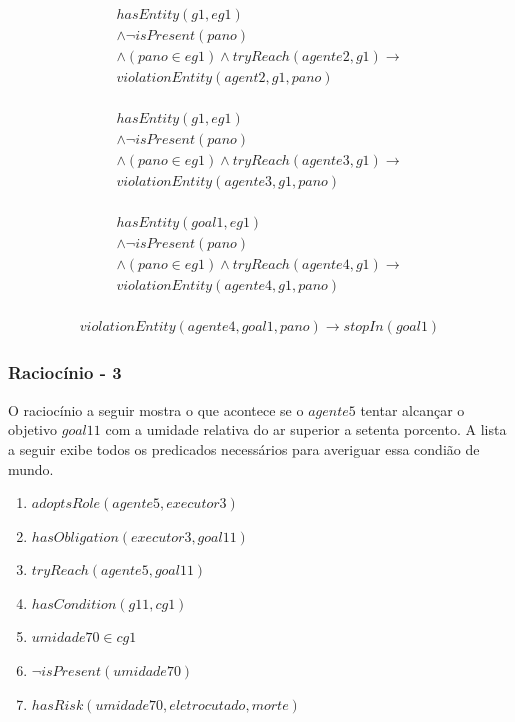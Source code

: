 \documentclass[12pt]{article}
\begin{document}
\begin{eqnarray}\nonumber
	hasEntity(g1,eg1) \nonumber \\ 
	\wedge \neg isPresent(pano) 	\nonumber \\ 
	\wedge (pano \in eg1) \wedge tryReach(agente2,g1) \to \nonumber \\ 
	violationEntity(agent2,g1,pano) \nonumber \\
\end{eqnarray}

\begin{eqnarray}\nonumber
	hasEntity(g1,eg1) \nonumber \\ 
	\wedge \neg isPresent(pano) 	\nonumber \\ 
	\wedge (pano \in eg1) \wedge tryReach(agente3,g1) \to \nonumber \\ 
	violationEntity(agente3,g1,pano) \nonumber \\
\end{eqnarray}

\begin{eqnarray}\nonumber
	hasEntity(goal1,eg1) \nonumber \\ 
	\wedge \neg isPresent(pano) 	\nonumber \\ 
	\wedge (pano \in eg1) \wedge tryReach(agente4,g1) \to \nonumber \\ 
	violationEntity(agente4,g1,pano) \nonumber \\
\end{eqnarray}

\begin{eqnarray}
	violationEntity(agente4,goal1,pano) \to stopIn(goal1)
\end{eqnarray}



\subsubsection{Raciocínio - 3} 

O raciocínio a seguir mostra o que acontece se o $agente5$ tentar alcançar o objetivo $goal11$ com a umidade relativa do ar superior a setenta porcento. A lista a seguir exibe todos os predicados necessários para averiguar essa condião de mundo. 

\begin{enumerate}
	\item $adoptsRole(agente5,executor3)$
	\item $hasObligation(executor3,goal11)$	
	\item $tryReach(agente5,goal11)$ 
	\item $hasCondition(g11,cg1)$
	\item $umidade70 \in cg1$	
	\item $\neg isPresent(umidade70)$
	\item $hasRisk(umidade70,eletrocutado,morte)$
\end{enumerate}
\end{document}
